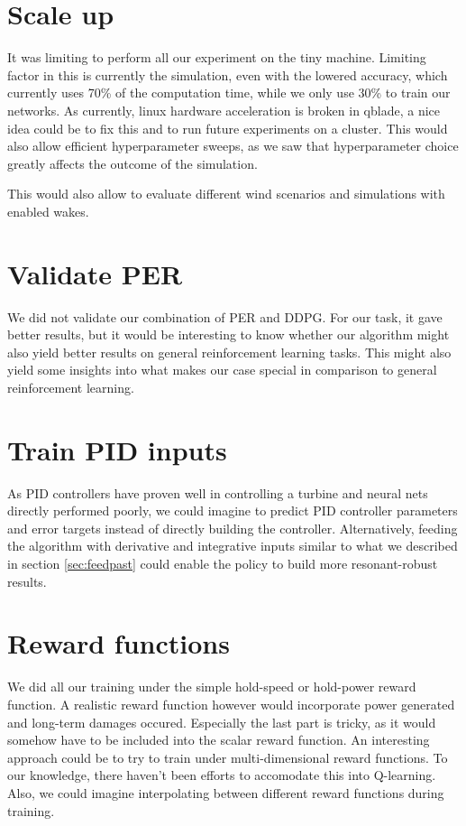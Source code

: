 \documentclass[hyperref,beleg]{cgvpub}
\begin{document}
\section{Scale up}

It was limiting to perform all our experiment on the tiny machine. Limiting factor in this is currently the simulation, even with the lowered accuracy, which currently uses 70\% of the computation time, while we only use 30\% to train our networks. As currently, linux hardware acceleration is broken in qblade, a nice idea could be to fix this and to run future experiments on a cluster. This would also allow efficient hyperparameter sweeps, as we saw that hyperparameter choice greatly affects the outcome of the simulation.

This would also allow to evaluate different wind scenarios and simulations with enabled wakes.

\section{Validate \ac{PER}}

We did not validate our combination of \ac{PER} and \ac{DDPG}. For our task, it gave better results, but it would be interesting to know whether our algorithm might also yield better results on general reinforcement learning tasks. This might also yield some insights into what makes our case special in comparison to general reinforcement learning.

\section{Train PID inputs}

As PID controllers have proven well in controlling a turbine and neural nets directly performed poorly, we could imagine to predict PID controller parameters and error targets instead of directly building the controller. Alternatively, feeding the algorithm with derivative and integrative inputs similar to what we described in section \ref{sec:feedpast} could enable the policy to build more resonant-robust results.

\section{Reward functions}

We did all our training under the simple hold-speed or hold-power reward function. A realistic reward function however would incorporate power generated and long-term damages occured. Especially the last part is tricky, as it would somehow have to be included into the scalar reward function. An interesting approach could be to try to train under multi-dimensional reward functions. To our knowledge, there haven't been efforts to accomodate this into Q-learning. Also, we could imagine interpolating between different reward functions during training.
\end{document}
